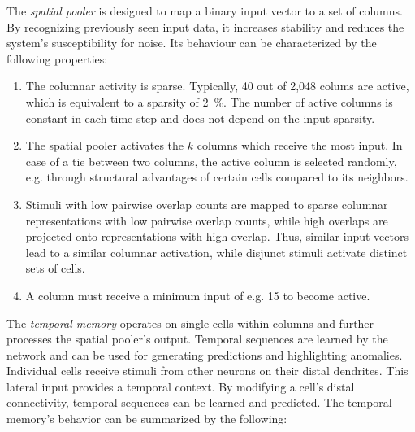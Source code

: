 \label{sec:spatial_pooler_properties}

The \emph{spatial pooler} is designed to map a binary input vector to a set of
columns. By recognizing previously seen input data, it increases stability and
reduces the system's susceptibility for noise. Its behaviour can be
characterized by the following properties:

\begin{enumerate}
	\item\label{enm:spatial_pooler_sparsity} The columnar activity is sparse.
	Typically, 40 out of 2,048 colums are active, which is equivalent to a sparsity
	of \SI{2}{\%}. The number of active columns is constant in each time step and
	does not depend on the input sparsity.

	\item\label{enm:spatial_pooler_selection} The spatial pooler activates the $k$
	columns which receive the most input. In case of a tie between two columns, the
	active column is selected randomly, e.g. through structural advantages of
	certain cells compared to its neighbors.

	\item\label{enm:spatial_pooler_overlap} Stimuli with low pairwise overlap
	counts are mapped to sparse columnar representations with low pairwise
	overlap counts, while high overlaps are projected onto representations
	with high overlap. Thus, similar input vectors lead to a similar columnar
	activation, while disjunct stimuli activate distinct sets of cells.

	\item\label{enm:spatial_pooler_minimum} A column must receive a minimum input
	of e.g. 15 to become active.

\end{enumerate}


The \emph{temporal memory} operates on single cells within columns and further
processes the spatial pooler's output. Temporal sequences are learned by the
network and can be used for generating predictions and highlighting anomalies.
Individual cells receive stimuli from other neurons on their distal dendrites.
This lateral input provides a temporal context. By modifying a cell's distal
connectivity, temporal sequences can be learned and predicted. The temporal
memory's behavior can be summarized by the following:

